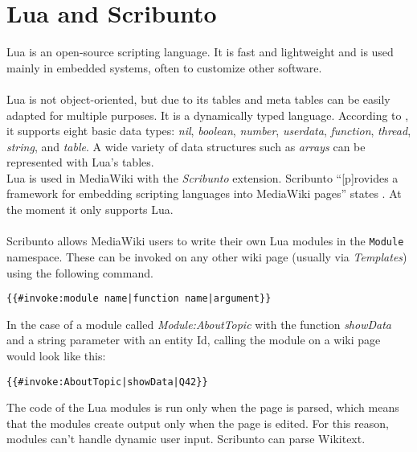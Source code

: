 \section{Lua and Scribunto}


Lua is an open-source scripting language. It is fast and lightweight and is used mainly in embedded systems, often to customize other software. \citep{lua:01} \\
\\
Lua is not object-oriented, but due to its tables and meta tables can be easily adapted for multiple purposes. It is a dynamically typed language. According to \citet[9]{luabook:01}, it supports eight basic data types: \textit{nil}, \textit{boolean}, \textit{number}, \textit{userdata}, \textit{function}, \textit{thread}, \textit{string}, and \textit{table}. A wide variety of data structures such as \textit{arrays} can be represented with Lua's tables. \\
Lua is used in MediaWiki with the \textit{Scribunto} extension. Scribunto ``[p]rovides a framework for embedding scripting languages into MediaWiki pages'' states \citet{wiki:19}. At the moment it only supports Lua. \\
\\
Scribunto allows MediaWiki users to write their own Lua modules in the \texttt{\justify Module} namespace. These can be invoked on any other wiki page (usually via \textit{Templates}) using the following command.
\begin{lstlisting}[frame=single] 
{{#invoke:module name|function name|argument}}
\end{lstlisting}

In the case of a module called \textit{Module:AboutTopic} with the function \textit{showData} and a string parameter with an entity Id, calling the module on a wiki page would look like this:
\begin{lstlisting}[frame=single] 
{{#invoke:AboutTopic|showData|Q42}}
\end{lstlisting}

The code of the Lua modules is run only when the page is parsed, which means that the modules create output only when the page is edited. For this reason, modules can't handle dynamic user input. \citep{wiki:20} Scribunto can parse Wikitext.
